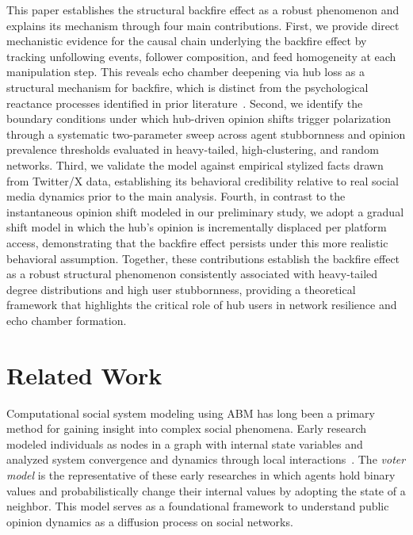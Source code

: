 \documentclass[pdflatex,sn-mathphys-num]{sn-jnl}%
\theoremstyle{thmstyleone}%
\theoremstyle{thmstyletwo}%
\theoremstyle{thmstylethree}%
\begin{document}
This paper establishes the structural backfire effect as a robust
phenomenon and explains its mechanism through four main contributions.
First, we provide direct mechanistic evidence for the causal chain underlying the backfire
effect by tracking unfollowing events, follower composition, and feed homogeneity at each
manipulation step. This reveals echo chamber deepening via
hub loss as a structural mechanism for backfire, which is
distinct from the psychological reactance processes identified in prior literature~\cite{Bail2018}.
Second, we identify the boundary conditions under which hub-driven opinion shifts trigger
polarization through a systematic two-parameter sweep across agent stubbornness and
opinion prevalence thresholds evaluated in heavy-tailed, high-clustering, and random networks.
Third, we validate the model against empirical stylized facts drawn from Twitter/X data,
establishing its behavioral credibility relative to real social media dynamics prior to the main analysis.
Fourth, in contrast to the instantaneous opinion shift modeled in our preliminary study,
we adopt a gradual shift model in which the hub's opinion is incrementally displaced
per platform access, demonstrating that the backfire effect persists under this
more realistic behavioral assumption.
Together, these contributions establish the backfire effect as a robust structural phenomenon consistently
associated with heavy-tailed degree distributions and high user stubbornness,
providing a theoretical framework that highlights the
critical role of hub users in network resilience and echo chamber formation.


\section{Related Work}\label{RelatedWork}
Computational social system modeling using ABM has long been a
primary method for gaining insight
into complex social phenomena. Early research modeled individuals
as nodes in a graph with internal state variables and analyzed system
convergence and dynamics through local interactions~\cite{Clifford1973,Liggett1975,Axelrod1997,Sznajd2005,Galam2008}.
The \emph{voter model} is the representative of these early researches in which agents
hold binary values and probabilistically change their internal values
by adopting the state of a neighbor. This model serves as a foundational
framework to understand public opinion dynamics as a diffusion
process on social networks.
\par
\end{document}
